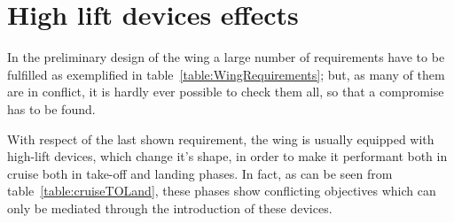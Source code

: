 \chapter{High lift devices effects}
In the preliminary design of the wing a large number of requirements have to be fulfilled as exemplified in table~\ref{table:WingRequirements}; but, as many of them are in conflict, it is hardly ever possible to check them all, so that a compromise has to be found.

\begin{table}[!h]
\caption{Some wing design requirements}
\label{table:WingRequirements}
\end{table}

\noindent
With respect of the last shown requirement, the wing is usually equipped with high-lift devices, which change it's shape, in order to make it performant both in cruise both in take-off and landing phases. In fact, as can be seen from table~\ref{table:cruiseTOLand}, these phases show conflicting objectives which can only be mediated through the introduction of these devices.

